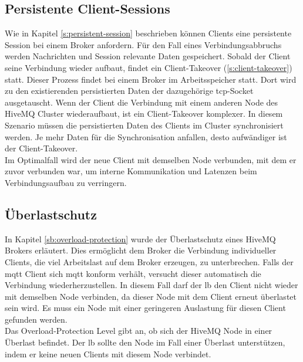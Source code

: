 \subsection{Persistente Client-Sessions} \label{sp:persistent-session}
Wie in Kapitel \ref{s:persistent-session} beschrieben können Clients eine persistente Session bei einem Broker anfordern.
Für den Fall eines Verbindungsabbruchs werden Nachrichten und Session relevante Daten gespeichert.
Sobald der Client seine Verbindung wieder aufbaut, findet ein Client-Takeover (\ref{s:client-takeover}) statt.
Dieser Prozess findet bei einem Broker im Arbeitsspeicher statt.
Dort wird zu den existierenden persistierten Daten der dazugehörige \ac{tcp}-Socket ausgetauscht.
Wenn der Client die Verbindung mit einem anderen Node des HiveMQ Cluster wiederaufbaut, ist ein Client-Takeover komplexer.
In diesem Szenario müssen die persistierten Daten des Clients im Cluster synchronisiert werden.
Je mehr Daten für die Synchronisation anfallen, desto aufwändiger ist der Client-Takeover.
\\
Im Optimalfall wird der neue Client mit demselben Node verbunden, mit dem er zuvor verbunden war, um interne Kommunikation und Latenzen beim Verbindungsaufbau zu verringern.

\subsection{Überlastschutz}
In Kapitel \ref{sb:overload-protection} wurde der Überlastschutz eines HiveMQ Brokers erläutert. Dies ermöglicht dem Broker die Verbindung individueller Clients, die viel Arbeitslast auf dem Broker erzeugen, zu unterbrechen. Falls der \ac{mqtt} Client sich \ac{mqtt} konform verhält, versucht dieser automatisch die Verbindung wiederherzustellen.
In diesem Fall darf der \acl{lb} den Client nicht wieder mit demselben Node verbinden, da dieser Node mit dem Client erneut überlastet sein wird. Es muss ein Node mit einer geringeren Auslastung für diesen Client gefunden werden.
\\
Das Overload-Protection Level gibt an, ob sich der HiveMQ Node in einer Überlast befindet.
Der \acl{lb} sollte den Node im Fall einer Überlast unterstützen, indem er keine neuen Clients mit diesem Node verbindet.

